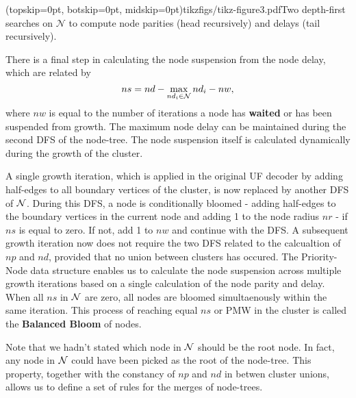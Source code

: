 \Figure[htb](topskip=0pt, botskip=0pt, midskip=0pt){tikzfigs/tikz-figure3.pdf}{Two depth-first searches on $\mathcal{N}$ to compute node parities (head recursively) and delays (tail recursively).\label{fig3}}

There is a final step in calculating the node suspension from the node delay, which are related by
\begin{equation}
    ns = nd - \max_{nd_i \in \mathcal{N}} nd_i - nw, 
\end{equation}
where $nw$ is equal to the number of iterations a node has \textbf{waited} or has been suspended from growth. The maximum node delay can be maintained during the second DFS of the node-tree. The node suspension itself is calculated dynamically during the growth of the cluster. 

A single growth iteration, which is applied in the original UF decoder by adding half-edges to all boundary vertices of the cluster, is now replaced by another DFS of $\mathcal{N}$. During this DFS, a node is conditionally bloomed - adding half-edges to the boundary vertices in the current node and adding 1 to the node radius $nr$ - if $ns$ is equal to zero. If not, add 1 to $nw$ and continue with the DFS. A subsequent growth iteration now does not require the two DFS related to the calcualtion of $np$ and $nd$, provided that no union between clusters has occured. The Priority-Node data structure enables us to calculate the node suspension across multiple growth iterations based on a single calculation of the node parity and delay. When all $ns$ in $\mathcal{N}$ are zero, all nodes are bloomed simultaenously within the same iteration. This process of reaching equal $ns$ or PMW in the cluster is called the \textbf{Balanced Bloom} of nodes. 

Note that we hadn't stated which node in $\mathcal{N}$ should be the root node. In fact, any node in $\mathcal{N}$ could have been picked as the root of the node-tree. This property, together with the constancy of $np$ and $nd$ in betwen cluster unions, allows us to define a set of rules for the merges of node-trees.  